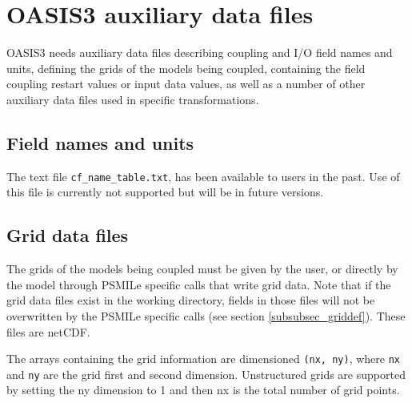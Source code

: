 \newpage
\chapter{OASIS3 auxiliary data files}
\label{sec_auxiliary}

OASIS3 needs auxiliary data files describing coupling and I/O field
names and units, defining the grids of the models being coupled,
containing the field coupling restart values or input data values, as
well as a number of other auxiliary data files used in specific
transformations. 

\section{Field names and units}
\label{subsec_cfnametable}

The text file \texttt{cf\_name\_table.txt}, has been available to users
in the past.  Use of this file is currently not supported but will
be in future versions.


\section{Grid data files}
\label{subsec_griddata}

The grids of the models being coupled must be given by the user, or
directly by the model through PSMILe specific calls that write grid data. 
Note that if the 
grid data files exist in the working directory, fields in those files will
not be overwritten by the PSMILe specific calls (see section
\ref{subsubsec_griddef}). These files are netCDF.

The arrays containing the grid information are dimensioned {\tt (nx, ny)},
where {\tt nx} and {\tt ny} are the grid first and second dimension.
Unstructured grids are supported by setting the ny dimension to 1
and then nx is the total number of grid points.


